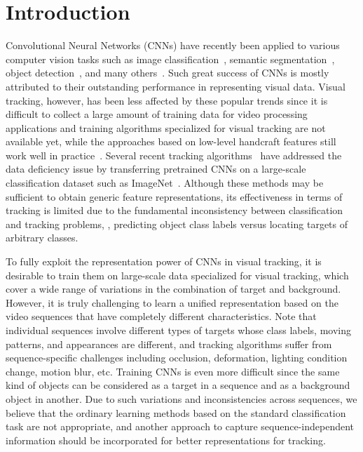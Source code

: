 \documentclass[10pt,twocolumn,letterpaper]{article}
\begin{document}
\section{Introduction}

Convolutional Neural Networks (CNNs) have recently been applied to various computer vision tasks such as image classification~\cite{krizhevsky2012imagenet,chatfield2014return,SimonyanICLR15}, semantic segmentation~\cite{long2014fully}, object detection~\cite{girshick2014rich}, and many others~\cite{toshev2014deeppose,taigman2014deepface}.
Such great success of CNNs is mostly attributed to their outstanding performance in representing visual data.
Visual tracking, however, has been less affected by these popular trends since it is difficult to collect a large amount of training data for video processing applications and training algorithms specialized for visual tracking are not available yet, while the approaches based on low-level handcraft features still work well in practice~\cite{henriques2015high,danelljan2014accurate,hong2015multi,zhang2014meem}. 
Several recent tracking algorithms~\cite{hong2015online,wang2015transferring} have addressed the data deficiency issue by transferring pretrained CNNs on a large-scale classification dataset such as ImageNet~\cite{ILSVRC15}. 
Although these methods may be sufficient to obtain generic feature representations, its effectiveness in terms of tracking is limited due to the fundamental inconsistency between classification and tracking problems, \ie, predicting object class labels versus locating targets of arbitrary classes.

To fully exploit the representation power of CNNs in visual tracking, it is desirable to train them on large-scale data specialized for visual tracking, which cover a wide range of variations in the combination of target and background.
However, it is truly challenging to learn a unified representation based on the video sequences that have completely different characteristics.
Note that individual sequences involve different types of targets whose class labels, moving patterns, and appearances are different, and tracking algorithms suffer from sequence-specific challenges including occlusion, deformation, lighting condition change, motion blur, etc.
Training CNNs is even more difficult since the same kind of objects can be considered as a target in a sequence and as a background object in another.
Due to such variations and inconsistencies across sequences, we believe that the ordinary learning methods based on the standard classification task are not appropriate, and another approach to capture sequence-independent information should be incorporated for better representations for tracking.
\end{document}
